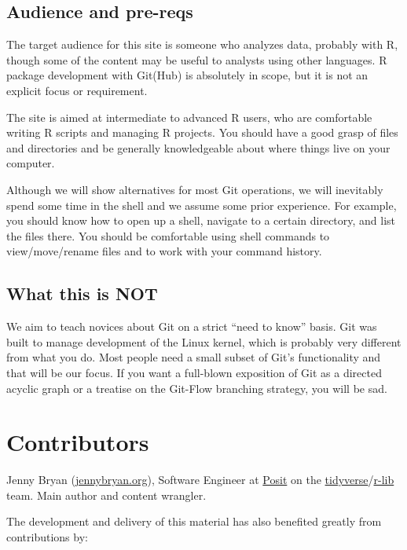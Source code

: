 \documentclass[
]{book}
\begin{document}
\section{Audience and pre-reqs}\label{audience-and-pre-reqs}

The target audience for this site is someone who analyzes data, probably with R, though some of the content may be useful to analysts using other languages. R package development with Git(Hub) is absolutely in scope, but it is not an explicit focus or requirement.

The site is aimed at intermediate to advanced R users, who are comfortable writing R scripts and managing R projects. You should have a good grasp of files and directories and be generally knowledgeable about where things live on your computer.

Although we will show alternatives for most Git operations, we will inevitably spend some time in the shell and we assume some prior experience. For example, you should know how to open up a shell, navigate to a certain directory, and list the files there. You should be comfortable using shell commands to view/move/rename files and to work with your command history.

\section{What this is NOT}\label{what-this-is-not}

We aim to teach novices about Git on a strict ``need to know'' basis. Git was built to manage development of the Linux kernel, which is probably very different from what you do. Most people need a small subset of Git's functionality and that will be our focus. If you want a full-blown exposition of Git as a directed acyclic graph or a treatise on the Git-Flow branching strategy, you will be sad.

\chapter{Contributors}\label{contrib}

Jenny Bryan (\href{https://jennybryan.org}{jennybryan.org}), Software Engineer at \href{https://posit.co/}{Posit} on the \href{https://www.tidyverse.org}{tidyverse}/\href{https://github.com/r-lib/}{r-lib} team. Main author and content wrangler.

The development and delivery of this material has also benefited greatly from contributions by:
\end{document}
